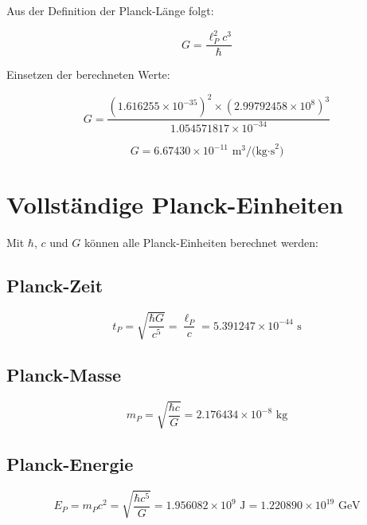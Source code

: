 \documentclass[12pt,a4paper]{article}
\theoremstyle{definition}
\begin{document}
	Aus der Definition der Planck-L\"ange folgt:
	
	\begin{equation}
		G = \frac{\ell_P^2 c^3}{\hbar}
	\end{equation}
	
	Einsetzen der berechneten Werte:
	
	\begin{equation}
		G = \frac{(1.616255 \times 10^{-35})^2 \times (2.99792458 \times 10^8)^3}{1.054571817 \times 10^{-34}}
	\end{equation}
	
	\begin{tcolorbox}[colback=green!5!white,colframe=green!75!black,title=Gravitationskonstante]
		\begin{equation}
			\boxed{G = 6.67430 \times 10^{-11} \text{ m}^3\text{/(kg·s}^2\text{)}}
		\end{equation}
	\end{tcolorbox}
	
	\section{Vollst\"andige Planck-Einheiten}
	
	Mit $\hbar$, $c$ und $G$ k\"onnen alle Planck-Einheiten berechnet werden:
	
	\subsection{Planck-Zeit}
	
	\begin{equation}
		t_P = \sqrt{\frac{\hbar G}{c^5}} = \frac{\ell_P}{c} = 5.391247 \times 10^{-44} \text{ s}
	\end{equation}
	
	\subsection{Planck-Masse}
	
	\begin{equation}
		m_P = \sqrt{\frac{\hbar c}{G}} = 2.176434 \times 10^{-8} \text{ kg}
	\end{equation}
	
	\subsection{Planck-Energie}
	
	\begin{equation}
		E_P = m_P c^2 = \sqrt{\frac{\hbar c^5}{G}} = 1.956082 \times 10^9 \text{ J} = 1.220890 \times 10^{19} \text{ GeV}
	\end{equation}
	
\end{document}
